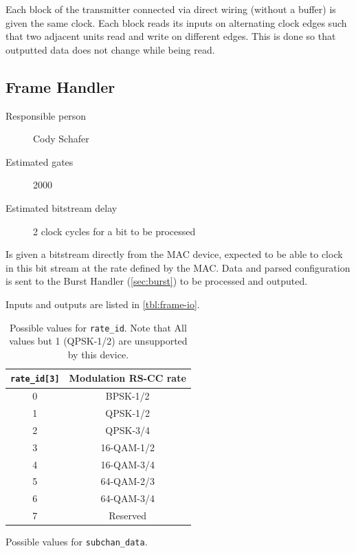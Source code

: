 \documentclass[dvips,10pt,twocolumn]{article}
\newcommand{\wire}{\texttt}
\begin{document}
Each block of the transmitter connected via direct wiring (without a
buffer) is given the same clock. Each block reads its inputs on alternating
clock edges such that two adjacent units read and write on different edges.
This is done so that outputted data does not change while being read.


\subsection{Frame Handler}
\begin{description}
	\item[Responsible person] Cody Schafer
	\item[Estimated gates] 2000
	\item[Estimated bitstream delay] 2 clock cycles for a bit to be
		processed 
\end{description}

Is given a bitstream directly from the MAC device, expected to be able to
clock in this bit stream at the rate defined by the MAC. Data and
parsed configuration is sent to the Burst Handler (\autoref{sec:burst})
to be processed and outputed.

Inputs and outputs are listed in \autoref{tbl:frame-io}.

\begin{table} \begin{center} \begin{tabularx}{0.5\textwidth}{c|c}
	\label{tbl:rate-id}
	\wire{rate\_id[3]} & Modulation RS-CC rate \\ \hline
	0 & BPSK-1/2 \\
	1 & QPSK-1/2 \\
	2 & QPSK-3/4 \\
	3 & 16-QAM-1/2 \\
	4 & 16-QAM-3/4 \\
	5 & 64-QAM-2/3 \\
	6 & 64-QAM-3/4 \\
	7 & Reserved
\end{tabularx} \caption{Possible values for \wire{rate\_id}. Note that
All values but 1 (QPSK-1/2) are unsupported by this device.}
\end{center} \end{table}

\begin{table}
	\label{tbl:subchan}
	
	\caption{Possible values for \wire{subchan\_data}.}
\end{table}
\end{document}
